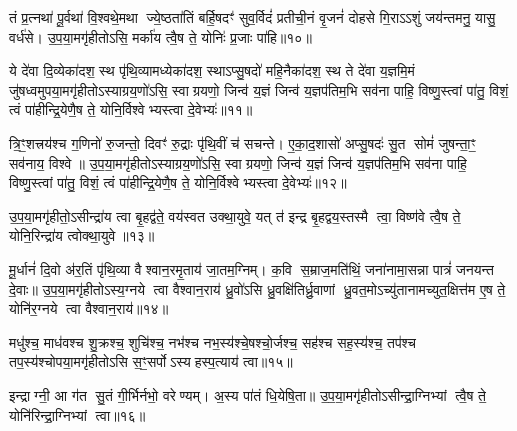 {\anuvakamend[{अ॒यं वे॒नः पञ्च॑विशतिः॥८॥}]}

तं प्र॒त्नथा॑ पू॒र्वथा॑ वि॒श्वथे॒मथा ज्ये॒ष्ठता॑तिं बर्\mbox{}हि॒षदꣳ॑ सुव॒र्विदं॑ प्रतीची॒नं वृ॒जनं॑ दोहसे गि॒राऽऽशुं जय॑न्तमनु॒ यासु॒ वर्ध॑से। उ॒प॒या॒मगृ॑हीतोऽसि॒ मर्का॑य त्वै॒ष ते॒ योनिः॑ प्र॒जाः पा॑हि॥१०॥

{\anuvakamend[{त षड्विꣳ॑शतिः॥९॥}]}

{\anuvakamend[{त्रि॒ꣳ॒शद् द्विच॑त्वारिशत्॥11॥}]}

ये दे॑वा दि॒व्येका॑दश॒ स्थ पृ॑थि॒व्यामध्येका॑दश॒ स्थाऽप्सु॒षदो॑ महि॒नैका॑दश॒ स्थ ते दे॑वा य॒ज्ञमि॒मं जु॑षध्वमुपया॒मगृ॑हीतोऽस्याग्रय॒णो॑ऽसि॒ स्वाग्रयणो॒ जिन्व॑ य॒ज्ञं जिन्व॑ य॒ज्ञप॑तिम॒भि सव॑ना पाहि॒ विष्णु॒स्त्वां पा॑तु॒ विशं॒ त्वं पा॑हीन्द्रि॒येणै॒ष ते॒ योनि॒र्विश्वेभ्यस्त्वा दे॒वेभ्यः॑॥११॥

त्रि॒ꣳ॒शत्त्रय॑श्च ग॒णिनो॑ रु॒जन्तो॒ दिवꣳ॑ रु॒द्राः पृ॑थि॒वीं च॑ सचन्ते। ए॒का॒द॒शासो॑ अप्सु॒षदः॑ सु॒त सोमं॑ जुषन्ता॒ꣳ॒ सव॑नाय॒ विश्वे॥ उ॒प॒या॒मगृ॑हीतोऽस्याग्रय॒णो॑ऽसि॒ स्वाग्रयणो॒ जिन्व॑ य॒ज्ञं जिन्व॑ य॒ज्ञप॑तिम॒भि सव॑ना पाहि॒ विष्णु॒स्त्वां पा॑तु॒ विशं॒ त्वं पा॑हीन्द्रि॒येणै॒ष ते॒ योनि॒र्विश्वेभ्यस्त्वा दे॒वेभ्यः॑॥१२॥

{\anuvakamend[{ये दे॑वा॒स्त्रिच॑त्वारिशत्॥10॥}]}

उ॒प॒या॒मगृ॑हीतो॒ऽसीन्द्रा॑य त्वा बृ॒हद्व॑ते॒ वय॑स्वत उक्था॒युवे॒ यत् त॑ इन्द्र बृ॒हद्वय॒स्तस्मै त्वा॒ विष्ण॑वे त्वै॒ष ते॒ योनि॒रिन्द्रा॑य त्वोक्था॒युवे॥१३॥

{\anuvakamend[{उ॒प॒या॒मगृ॑हीतो॒ द्वाविꣳ॑शतिः॥12॥}]}

मू॒र्धानं॑ दि॒वो अ॑र॒तिं पृ॑थि॒व्या वैश्वान॒रमृ॒ताय॑ जा॒तम॒ग्निम्। क॒वि स॒म्राज॒मति॑थिं॒ जना॑नामा॒सन्ना पात्रं॑ जनयन्त दे॒वाः॥ उ॒प॒या॒मगृ॑हीतोऽस्य॒ग्नये त्वा वैश्वान॒राय॑ ध्रु॒वो॑ऽसि ध्रु॒वक्षि॑तिर्ध्रु॒वाणां ध्रु॒वत॒मोऽच्यु॑तानामच्युत॒क्षित्त॑म ए॒ष ते॒ योनि॑र॒ग्नये त्वा वैश्वान॒राय॑॥१४॥

{\anuvakamend[{मू॒र्धानं॒ पञ्च॑त्रिशत्॥13॥}]}

मधु॑श्च॒ माध॑वश्च शु॒क्रश्च॒ शुचि॑श्च॒ नभ॑श्च नभ॒स्य॑श्चे॒षश्चो॒र्जश्च॒ सह॑श्च सह॒स्य॑श्च॒ तप॑श्च तप॒स्य॑श्चोपया॒मगृ॑हीतोऽसि स॒ꣳ॒सर्पोऽस्यहस्प॒त्याय॑ त्वा॥१५॥

{\anuvakamend[{मधु॑स्त्रि॒ꣳ॒शत्॥14॥}]}

इन्द्राग्नी॒ आ ग॑त सु॒तं गी॒र्भिर्नभो॒ वरेण्यम्। अ॒स्य पा॑तं धि॒येषि॒ता॥ उ॒प॒या॒मगृ॑हीतोऽसीन्द्रा॒ग्निभ्यां त्वै॒ष ते॒ योनि॑रिन्द्रा॒ग्निभ्यां त्वा॥१६॥

